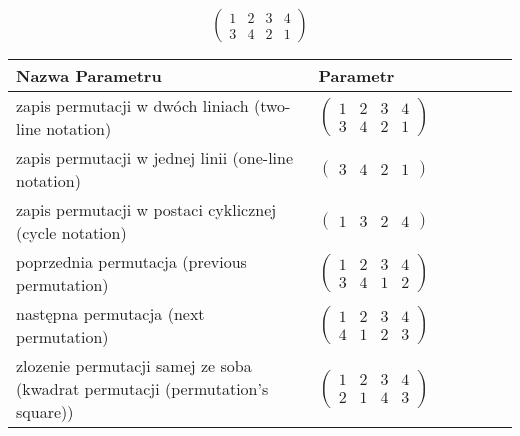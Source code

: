 \documentclass[12pt]{article}
\begin{document}
\subsection{}
\begin{center}
\[
\begin{pmatrix}
	1 & 2 & 3 & 4 \\ 
	3 & 4 & 2 & 1 
\end{pmatrix}
\]

\begin{tabular}{|m{0.6\linewidth}|m{0.4\linewidth}|}
	\hline
	Nazwa Parametru & Parametr \\
	\hline
	zapis permutacji w dwóch liniach (two-line notation) & $\begin{pmatrix} 1 & 2 & 3 & 4 \\ 
3 & 4 & 2 & 1 \end{pmatrix}$ \\ 
	\hline
	zapis permutacji w jednej linii (one-line notation) & $\begin{pmatrix} 3 & 4 & 2 & 1 \end{pmatrix}$ \\ 
	\hline
	zapis permutacji w postaci cyklicznej (cycle notation) & $\begin{pmatrix} 1 & 3 & 2 & 4 \end{pmatrix} $ \\ 
	\hline
	poprzednia permutacja (previous permutation) & $\begin{pmatrix} 1 & 2 & 3 & 4 \\ 
3 & 4 & 1 & 2 \end{pmatrix}$ \\ 
	\hline
	następna permutacja (next permutation) & $\begin{pmatrix} 1 & 2 & 3 & 4 \\ 
4 & 1 & 2 & 3 \end{pmatrix}$ \\ 
	\hline
	zlozenie permutacji samej ze soba (kwadrat permutacji (permutation's square)) & $\begin{pmatrix} 1 & 2 & 3 & 4 \\ 
2 & 1 & 4 & 3 \end{pmatrix}$ \\ 
	\hline
\end{tabular}
\end{center}
\end{document}
